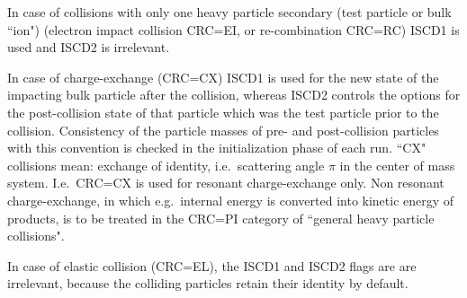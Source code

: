 In case of collisions with only one heavy particle secondary (test particle or
bulk ``ion") (electron impact collision CRC=EI, or re-combination CRC=RC) ISCD1
is used and ISCD2 is irrelevant.

In case of charge-exchange (CRC=CX) ISCD1 is used for the new state of the
impacting bulk particle after the collision, whereas ISCD2 controls the options
for the post-collision state of that particle which was the test particle prior
to the collision.
Consistency of the particle masses of pre- and post-collision particles with
this convention is checked in the initialization phase of each run.
``CX" collisions mean: exchange of identity, i.e.\ scattering angle $\pi$ in
the center of mass system.
I.e.\ CRC=CX is used for resonant charge-exchange only.
Non resonant charge-exchange, in which e.g.\ internal energy is converted into
kinetic energy of products, is to be treated in the CRC=PI category of
``general heavy particle collisions".

In case of  elastic collision (CRC=EL), the ISCD1 and ISCD2 flags are are
irrelevant, because the colliding particles retain their identity by default.

